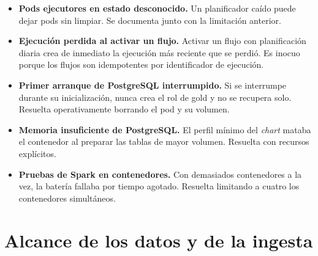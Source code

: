 \begin{itemize}
  tarea huérfana, dejada por un planificador caído, hace fallar todos los
  reinicios siguientes por un error aún abierto en Airflow. Resuelta
  operativamente marcando como fallidas esa tarea y su ejecución.
  \item \textbf{Pods ejecutores en estado desconocido.} Un planificador caído
  puede dejar pods sin limpiar. Se documenta junto con la limitación anterior.
  \item \textbf{Ejecución perdida al activar un flujo.} Activar un flujo con
  planificación diaria crea de inmediato la ejecución más reciente que se
  perdió. Es inocuo porque los flujos son idempotentes por identificador de
  ejecución.
  \item \textbf{Primer arranque de PostgreSQL interrumpido.} Si se interrumpe
  durante su inicialización, nunca crea el rol de gold y no se recupera solo.
  Resuelta operativamente borrando el pod y su volumen.
  \item \textbf{Memoria insuficiente de PostgreSQL.} El perfil mínimo del
  \textit{chart} mataba el contenedor al preparar las tablas de mayor
  volumen. Resuelta con recursos explícitos.
  \item \textbf{Pruebas de Spark en contenedores.} Con demasiados
  contenedores a la vez, la batería fallaba por tiempo agotado. Resuelta
  limitando a cuatro los contenedores simultáneos.
\end{itemize}

\section{Alcance de los datos y de la ingesta}
\label{sec:anexo_limitaciones_datos}

